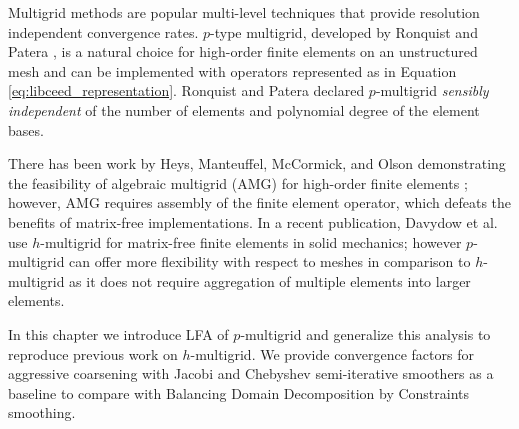 Multigrid methods are popular multi-level techniques that provide resolution independent convergence rates.
$p$-type multigrid, developed by Ronquist and Patera \cite{ronquist1987spectral}, is a natural choice for high-order finite elements on an unstructured mesh and can be implemented with operators represented as in Equation \ref{eq:libceed_representation}.
Ronquist and Patera declared $p$-multigrid \textit{sensibly independent} of the number of elements and polynomial degree of the element bases.

There has been work by Heys, Manteuffel, McCormick, and Olson demonstrating the feasibility of algebraic multigrid (AMG) for high-order finite elements \cite{heys2005algebraic}; however, AMG requires assembly of the finite element operator, which defeats the benefits of matrix-free implementations.
In a recent publication, Davydow et al. use $h$-multigrid for matrix-free finite elements in solid mechanics; however $p$-multigrid can offer more flexibility with respect to meshes in comparison to $h$-multigrid as it does not require aggregation of multiple elements into larger elements.

In this chapter we introduce LFA of $p$-multigrid and generalize this analysis to reproduce previous work on $h$-multigrid.
We provide convergence factors for aggressive coarsening with Jacobi and Chebyshev semi-iterative smoothers as a baseline to compare with Balancing Domain Decomposition by Constraints smoothing.

